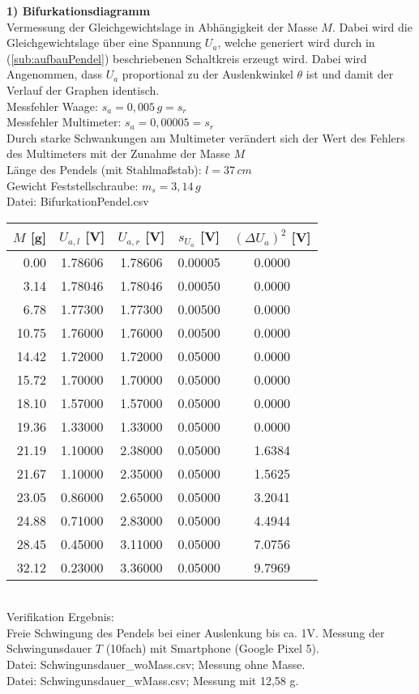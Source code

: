 \textbf{1) Bifurkationsdiagramm}\\
Vermessung der Gleichgewichtslage in Abhängigkeit der Masse $M$. Dabei wird die Gleichgewichtslage über eine Spannung $U_a$, welche generiert wird durch in (\ref{sub:aufbauPendel}) beschriebenen Schaltkreis erzeugt wird. Dabei wird Angenommen, dass $U_a$ proportional zu der Auslenkwinkel $\theta$ ist und damit der Verlauf der Graphen identisch.\\
Messfehler Waage: $s_a = 0,005\, g = s_r$\\
Messfehler Multimeter: $s_a = 0,00005 = s_r$\\
Durch starke Schwankungen am Multimeter verändert sich der Wert des Fehlers des Multimeters mit der Zunahme der Masse $M$\\
Länge des Pendels (mit Stahlmaßstab): $l = 37 \, cm$\\
Gewicht Feststellschraube: $m_s = 3,14 \,g$\\
Datei: BifurkationPendel.csv\\
\begin{tabular}{rcccc}
    $M$ [g] &  $U_{a,l}$ [V] &  $U_{a,r}$ [V] &  $s_{U_a}$ [V] &  $(\Delta U_a)^2$ [V] \\
    \hline
     0.00 &  1.78606 &  1.78606 &  0.00005 &   0.0000 \\
     3.14 &  1.78046 &  1.78046 &  0.00050 &   0.0000 \\
     6.78 &  1.77300 &  1.77300 &  0.00500 &   0.0000 \\
    10.75 &  1.76000 &  1.76000 &  0.00500 &   0.0000 \\
    14.42 &  1.72000 &  1.72000 &  0.05000 &   0.0000 \\
    15.72 &  1.70000 &  1.70000 &  0.05000 &   0.0000 \\
    18.10 &  1.57000 &  1.57000 &  0.05000 &   0.0000 \\
    19.36 &  1.33000 &  1.33000 &  0.05000 &   0.0000 \\
    21.19 &  1.10000 &  2.38000 &  0.05000 &   1.6384 \\
    21.67 &  1.10000 &  2.35000 &  0.05000 &   1.5625 \\
    23.05 &  0.86000 &  2.65000 &  0.05000 &   3.2041 \\
    24.88 &  0.71000 &  2.83000 &  0.05000 &   4.4944 \\
    28.45 &  0.45000 &  3.11000 &  0.05000 &   7.0756 \\
    32.12 &  0.23000 &  3.36000 &  0.05000 &   9.7969 \\
\end{tabular}\\
Verifikation Ergebnis:\\
Freie Schwingung des Pendels bei einer Auslenkung bis ca. 1V. Messung der Schwingunsdauer $T$ (10fach) mit Smartphone (Google Pixel 5).\\
Datei: Schwingunsdauer\_woMass.csv; Messung ohne Masse.\\
Datei: Schwingunsdauer\_wMass.csv; Messung mit 12,58 g.\\

